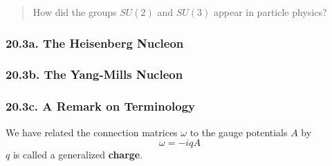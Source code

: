 \begin{quote}
  How did the groups $SU(2)$ and $SU(3)$ appear in particle physics?
\end{quote}



\subsubsection{ 20.3a. The Heisenberg Nucleon }

\subsubsection{ 20.3b. The Yang-Mills Nucleon }

\subsubsection{ 20.3c. A Remark on Terminology }

We have related the connection matrices $\omega$ to the gauge potentials $A$ by 
\[
\omega = -i q A
\]
$q$ is called a generalized \textbf{charge}.  




